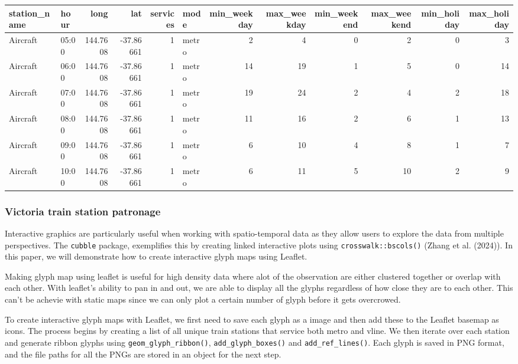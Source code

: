 \begin{table}
\centering
\begin{tabular}{l|l|r|r|r|l|r|r|r|r|r|r}
\hline
station\_name & hour & long & lat & services & mode & min\_weekday & max\_weekday & min\_weekend & max\_weekend & min\_holiday & max\_holiday\\
\hline
Aircraft & 05:00 & 144.7608 & -37.86661 & 1 & metro & 2 & 4 & 0 & 2 & 0 & 3\\
\hline
Aircraft & 06:00 & 144.7608 & -37.86661 & 1 & metro & 14 & 19 & 1 & 5 & 0 & 14\\
\hline
Aircraft & 07:00 & 144.7608 & -37.86661 & 1 & metro & 19 & 24 & 2 & 4 & 2 & 18\\
\hline
Aircraft & 08:00 & 144.7608 & -37.86661 & 1 & metro & 11 & 16 & 2 & 6 & 1 & 13\\
\hline
Aircraft & 09:00 & 144.7608 & -37.86661 & 1 & metro & 6 & 10 & 4 & 8 & 1 & 7\\
\hline
Aircraft & 10:00 & 144.7608 & -37.86661 & 1 & metro & 6 & 11 & 5 & 10 & 2 & 9\\
\hline
\end{tabular}
\end{table}

\hypertarget{victoria-train-station-patronage}{%
\subsubsection{Victoria train station patronage}\label{victoria-train-station-patronage}}

Interactive graphics are particularly useful when working with spatio-temporal data as they allow users to explore the data from multiple perspectives. The \texttt{cubble} package, exemplifies this by creating linked interactive plots using \texttt{crosswalk::bscols()} (Zhang et al. (2024)). In this paper, we will demonstrate how to create interactive glyph maps using Leaflet.

Making glyph map using leaflet is useful for high density data where alot of the observation are either clustered together or overlap with each other. With leaflet's ability to pan in and out, we are able to display all the glyphs regardless of how close they are to each other. This can't be achevie with static maps since we can only plot a certain number of glyph before it gets overcrowed.

To create interactive glyph maps with Leaflet, we first need to save each glyph as a image and then add these to the Leaflet basemap as icons. The process begins by creating a list of all unique train stations that service both metro and vline. We then iterate over each station and generate ribbon glyphs using \texttt{geom\_glyph\_ribbon()}, \texttt{add\_glyph\_boxes()} and \texttt{add\_ref\_lines()}. Each glyph is saved in PNG format, and the file paths for all the PNGs are stored in an object for the next step.

